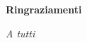 \thispagestyle{empty}

\begin{center}
  {\bf \Huge Ringraziamenti}
\end{center}

\vspace{4cm}


\emph{
  A tutti
}
